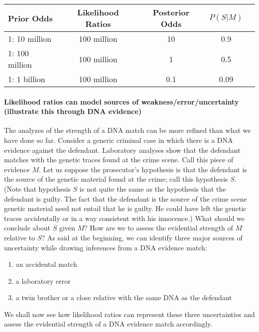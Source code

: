\documentclass[10pt]{article}
\begin{document}
\vspace{2mm}
\hspace{0.5cm}
\begin{centering}
\begin{tabular}{lcccc}
\hline
Prior Odds & Likelihood Ratios  &  Posterior Odds &  $P(S | M)$ \\
\hline
1: 10 million & 100 million & 10 & 0.9  \\
1: 100 million  & 100 million &  1 &0.5 \\
1: 1 billion & 100 million &  0.1 &  0.09 \\
\hline
\end{tabular}
\end{centering}
\vspace{2mm}


\paragraph{Likelihood ratios can model sources of weakness/error/uncertainty (illustrate this through DNA evidence)}

The analyzes of the strength of a DNA match can be more refined than what we have done so far. 
Consider a generic criminal case in which there is a DNA evidence against the defendant. Laboratory analyses show that the defendant matches with the genetic traces found at the crime scene. Call this piece of evidence $M$. 
Let us suppose the prosecutor's hypothesis is that the defendant is the source of the genetic 
material found at the crime; call this hypothesis $S$. 
(Note that hypothesis $S$ is not quite the same as the hypothesis that the defendant is guilty. The fact that the defendant is the source of the crime 
scene genetic material need not entail that he is guilty. He could have left the genetic traces accidentally 
or in a way consistent with his innocence.) What should we conclude about $S$ given $M$?
How are we to assess the evidential strength of $M$ relative to $S$?
As said at the beginning, we can identify three major sources of uncertainty 
while drawing inferences from a DNA evidence match:
%
\begin{enumerate}
\item an accidental match
\item a laboratory error
\item a twin brother or a close relative with the same DNA as the defendant 
\end{enumerate}
%
We shall now see how likelihood ratios can represent  
these three uncertainties and assess the evidential strength of a DNA 
evidence match accordingly. 
\end{document}
